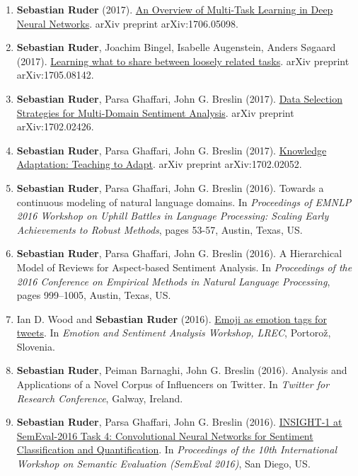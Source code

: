 \documentclass[10pt,letterpaper]{article}
\begin{document}
\begin{enumerate}
	\item \textbf{Sebastian Ruder} (2017). \href{https://arxiv.org/abs/1706.05098}{An Overview of Multi-Task Learning in Deep Neural Networks}. arXiv preprint arXiv:1706.05098.
	
	\item \textbf{Sebastian Ruder}, Joachim Bingel, Isabelle Augenstein, Anders Søgaard (2017). \href{https://arxiv.org/abs/1705.08142}{Learning what to share between loosely related tasks}. arXiv preprint arXiv:1705.08142.
	
	\item \textbf{Sebastian Ruder}, Parsa Ghaffari, John G. Breslin (2017). \href{https://arxiv.org/abs/1702.02426}{Data Selection Strategies for Multi-Domain Sentiment Analysis}. arXiv preprint arXiv:1702.02426.
	
	\item \textbf{Sebastian Ruder}, Parsa Ghaffari, John G. Breslin (2017). \href{https://arxiv.org/abs/1702.02052}{Knowledge Adaptation: Teaching to Adapt}. arXiv preprint arXiv:1702.02052.
	
	\item \textbf{Sebastian Ruder}, Parsa Ghaffari, John G. Breslin (2016). Towards a continuous modeling of natural language domains. In \textit{Proceedings of EMNLP 2016 Workshop on Uphill Battles in Language Processing: Scaling Early Achievements to Robust Methods}, pages 53-57, Austin, Texas, US.
	
	\item \textbf{Sebastian Ruder}, Parsa Ghaffari, John G. Breslin (2016). A Hierarchical Model of Reviews for Aspect-based Sentiment Analysis. In \textit{Proceedings of the 2016 Conference on Empirical Methods in Natural Language Processing}, pages 999–1005, Austin, Texas, US.
	
	\item Ian D. Wood and \textbf{Sebastian Ruder} (2016). \href{http://gsi.dit.upm.es/esa2016/Proceedings-ESA2016.pdf}{Emoji as emotion tags for tweets}. In \textit{Emotion and Sentiment Analysis Workshop, LREC}, Portorož, Slovenia.
	
	\item \textbf{Sebastian Ruder}, Peiman Barnaghi, John G. Breslin (2016). Analysis and Applications of a Novel Corpus of Influencers on Twitter. In \textit{Twitter for Research Conference}, Galway, Ireland.
	
	\item \textbf{Sebastian Ruder}, Parsa Ghaffari, John G. Breslin (2016). \href{http://www.anthology.aclweb.org/S/S16/S16-1026.pdf}{INSIGHT-1 at SemEval-2016 Task 4: Convolutional Neural Networks for Sentiment Classification and Quantification}. In \textit{Proceedings of the 10th International Workshop on Semantic Evaluation (SemEval 2016)}, San Diego, US.
	

\end{enumerate}
\end{document}
